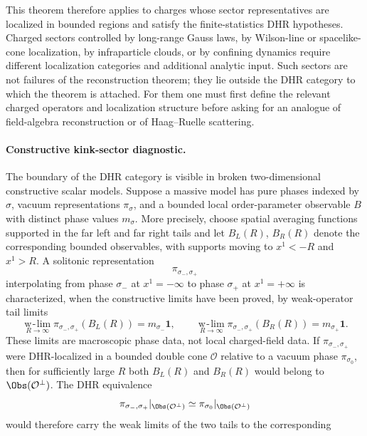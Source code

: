 This theorem therefore applies to charges whose sector representatives are
localized in bounded regions and satisfy the finite-statistics DHR
hypotheses.  Charged sectors controlled by long-range Gauss laws, by
Wilson-line or spacelike-cone localization, by infraparticle clouds, or by
confining dynamics require different localization categories and additional
analytic input.  Such sectors are not failures of the reconstruction theorem;
they lie outside the DHR category to which the theorem is attached.  For them
one must first define the relevant charged operators and localization
structure before asking for an analogue of field-algebra reconstruction or of
Haag--Ruelle scattering.

\paragraph{Constructive kink-sector diagnostic.}
The boundary of the DHR category is visible in broken two-dimensional
constructive scalar models.  Suppose a massive model has pure phases indexed
by \(\sigma\), vacuum representations \(\pi_\sigma\), and a bounded local
order-parameter observable \(B\) with distinct phase values \(m_\sigma\).
More precisely, choose spatial averaging functions supported in the far left
and far right tails and let \(B_L(R)\), \(B_R(R)\) denote the corresponding
bounded observables, with supports moving to \(x^1<-R\) and \(x^1>R\).  A
solitonic representation
\[
  \pi_{\sigma_-,\sigma_+}
\]
interpolating from phase \(\sigma_-\) at \(x^1=-\infty\) to phase
\(\sigma_+\) at \(x^1=+\infty\) is characterized, when the constructive
limits have been proved, by weak-operator tail limits
\begin{equation}
  \mathop{\mathrm{w\!-\!lim}}\limits_{R\to\infty}
  \pi_{\sigma_-,\sigma_+}(B_L(R))
  =
  m_{\sigma_-}\mathbf 1,\qquad
  \mathop{\mathrm{w\!-\!lim}}\limits_{R\to\infty}
  \pi_{\sigma_-,\sigma_+}(B_R(R))
  =
  m_{\sigma_+}\mathbf 1 .
  \label{eq:kink-tail-order-parameter-limits}
\end{equation}
These limits are macroscopic phase data, not local charged-field data.  If
\(\pi_{\sigma_-,\sigma_+}\) were DHR-localized in a bounded double cone
\(\mathcal O\) relative to a vacuum phase \(\pi_{\sigma_0}\), then for
sufficiently large \(R\) both \(B_L(R)\) and \(B_R(R)\) would belong to
\(\Obs(\mathcal O^\perp)\).  The DHR equivalence
\[
  \pi_{\sigma_-,\sigma_+}|_{\Obs(\mathcal O^\perp)}
  \simeq
  \pi_{\sigma_0}|_{\Obs(\mathcal O^\perp)}
\]
would therefore carry the weak limits of the two tails to the corresponding
